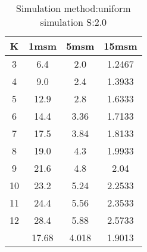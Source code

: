 \begin{table}[H]
\centering
\begin{tabular}{c|ccc}
K &1msm &5msm &15msm\\
\hline
3 & 6.4 & 2.0 & 1.2467\\
4 & 9.0 & 2.4 & 1.3933\\
5 & 12.9 & 2.8 & 1.6333\\
6 & 14.4 & 3.36 & 1.7133\\
7 & 17.5 & 3.84 & 1.8133\\
8 & 19.0 & 4.3 & 1.9933\\
9 & 21.6 & 4.8 & 2.04\\
10 & 23.2 & 5.24 & 2.2533\\
11 & 24.4 & 5.56 & 2.3533\\
12 & 28.4 & 5.88 & 2.5733\\
\hline
& 17.68 & 4.018 & 1.9013\\
\end{tabular}
\caption{Simulation method:uniform simulation S:2.0}
\label{tab:s2.0}
\end{table}

